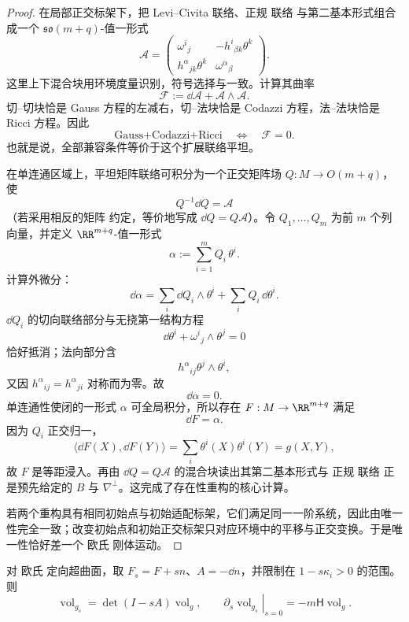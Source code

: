 \begin{proof}
在局部正交标架下，把 Levi--Civita 联络、正规 联络 与第二基本形式组合成一个 $\mathfrak{so}(m+q)$-值一形式
\[
\mathcal A=
\begin{pmatrix}
\omega^i{}_j & -h^i{}_{\beta k}\theta^k\\
 h^\alpha{}_{jk}\theta^k & \omega^\alpha{}_{\beta}
\end{pmatrix}.
\]
这里上下混合块用环境度量识别，符号选择与一致。计算其曲率
\[
\mathcal F
:=\dd\mathcal A+\mathcal A\wedge\mathcal A.
\]
切--切块恰是 Gauss 方程的左减右，切--法块恰是 Codazzi 方程，法--法块恰是 Ricci 方程。因此
\begin{equation}
\text{Gauss+Codazzi+Ricci}
\quad\Longleftrightarrow\quad
\mathcal F=0.
\label{eq:math-dg-submanifold-flat-extended-connection}
\end{equation}
也就是说，全部兼容条件等价于这个扩展联络平坦。

在单连通区域上，平坦矩阵联络可积分为一个正交矩阵场 $Q:M\to O(m+q)$，使
\[
Q^{-1}\dd Q=\mathcal A
\]
（若采用相反的矩阵 约定，等价地写成 $\dd Q=Q\mathcal A$）。令 $Q_1,\ldots,Q_m$ 为前 $m$ 个列向量，并定义 $\RR^{m+q}$-值一形式
\[
\alpha:=\sum_{i=1}^m Q_i\,\theta^i.
\]
计算外微分：
\[
\dd\alpha
=\sum_i \dd Q_i\wedge\theta^i
+\sum_i Q_i\,\dd\theta^i.
\]
$\dd Q_i$ 的切向联络部分与无挠第一结构方程
\[
\dd\theta^i+\omega^i{}_j\wedge\theta^j=0
\]
恰好抵消；法向部分含
\[
h^\alpha{}_{ij}\theta^j\wedge\theta^i,
\]
又因 $h^\alpha{}_{ij}=h^\alpha{}_{ji}$ 对称而为零。故
\[
\dd\alpha=0.
\]
单连通性使闭的一形式 $\alpha$ 可全局积分，所以存在 $F:M\to\RR^{m+q}$ 满足
\[
\dd F=\alpha.
\]
因为 $Q_i$ 正交归一，
\[
\langle \dd F(X),\dd F(Y)\rangle
=\sum_i\theta^i(X)\theta^i(Y)=g(X,Y),
\]
故 $F$ 是等距浸入。再由 $\dd Q=Q\mathcal A$ 的混合块读出其第二基本形式与 正规 联络 正是预先给定的 $B$ 与 $\nabla^\perp$。这完成了存在性重构的核心计算。

若两个重构具有相同初始点与初始适配标架，它们满足同一一阶系统，因此由唯一性完全一致；改变初始点和初始正交标架只对应环境中的平移与正交变换。于是唯一性恰好差一个 欧氏 刚体运动。
\end{proof}

\begin{proposition}[平行曲面的平均曲率响应]
对 欧氏 定向超曲面，取 $F_s=F+sn$、$A=-\dd n$，并限制在 $1-s\kappa_i>0$ 的范围。则\[\operatorname{vol}_{g_s}=\det(I-sA)\operatorname{vol}_g,\qquad\left.\partial_s\operatorname{vol}_{g_s}\right|_{s=0}=-m\mathsf H\operatorname{vol}_g.\]
\end{proposition}

